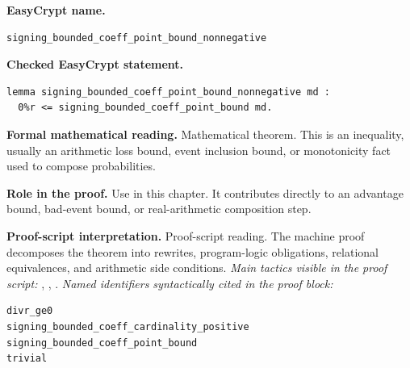 \begin{formaltheorem}
\noindent\textbf{EasyCrypt name.}
\begin{lstlisting}[language=EasyCrypt,basicstyle=\ttfamily\scriptsize]
signing_bounded_coeff_point_bound_nonnegative
\end{lstlisting}
\noindent\textbf{Checked EasyCrypt statement.}
\begin{lstlisting}[language=EasyCrypt,basicstyle=\ttfamily\scriptsize]
lemma signing_bounded_coeff_point_bound_nonnegative md :
  0%r <= signing_bounded_coeff_point_bound md.
\end{lstlisting}
\noindent\textbf{Formal mathematical reading.}
Mathematical theorem. This is an inequality, usually an arithmetic loss bound, event inclusion bound, or monotonicity fact used to compose probabilities.

\noindent\textbf{Role in the proof.}
Use in this chapter. It contributes directly to an advantage bound, bad-event bound, or real-arithmetic composition step.

\noindent\textbf{Proof-script interpretation.}
Proof-script reading. The machine proof decomposes the theorem into rewrites, program-logic obligations, relational equivalences, and arithmetic side conditions.
\emph{Main tactics visible in the proof script:} , , .
\emph{Named identifiers syntactically cited in the proof block:}
\begin{lstlisting}[language=EasyCrypt,basicstyle=\ttfamily\scriptsize]
divr_ge0
signing_bounded_coeff_cardinality_positive
signing_bounded_coeff_point_bound
trivial
\end{lstlisting}

\end{formaltheorem}

